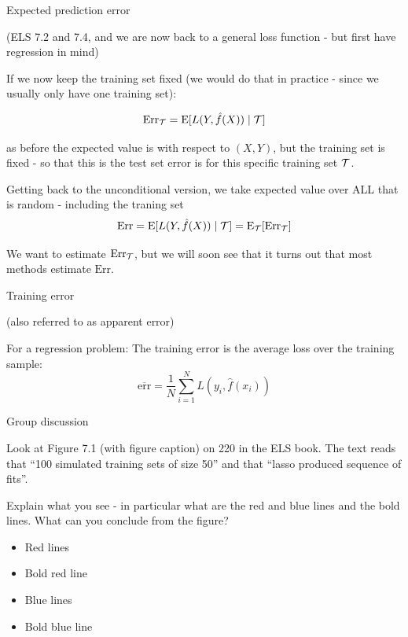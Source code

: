 \documentclass[
  ignorenonframetext,
]{beamer}
\providecommand{\tightlist}{%
  \setlength{\itemsep}{0pt}\setlength{\parskip}{0pt}}
\begin{document}
\begin{frame}

\begin{block}{Expected prediction error}

(ELS 7.2 and 7.4, and we are now back to a general loss function - but
first have regression in mind)

If we now keep the training set fixed (we would do that in practice -
since we usually only have one training set):

\[ \text{Err}_{\cal T}=\text{E}[L(Y,\hat{f}(X))\mid {\cal T}]\]

as before the expected value is with respect to \((X,Y)\), but the
training set is fixed - so that this is the test set error is for this
specific training set \({\cal T}\).

Getting back to the unconditional version, we take expected value over
ALL that is random - including the traning set
\[ \text{Err}=\text{E}[L(Y,\hat{f}(X))\mid {\cal T}]=\text{E}_{\cal T} [\text{Err}_{\cal T}]\]

We want to estimate \(\text{Err}_{\cal T}\), but we will soon see that
it turns out that most methods estimate \(\text{Err}\).

\end{block}

\end{frame}

\begin{frame}

\begin{block}{Training error}

(also referred to as apparent error)

For a regression problem: The training error is the average loss over
the training sample:
\[\overline{\text{err}}=\frac{1}{N} \sum_{i=1}^N L(y_i,\hat{f}(x_i))\]

\end{block}

\begin{block}{Group discussion}

Look at Figure 7.1 (with figure caption) on 220 in the ELS book. The
text reads that ``100 simulated training sets of size 50'' and that
``lasso produced sequence of fits''.

Explain what you see - in particular what are the red and blue lines and
the bold lines. What can you conclude from the figure?

\begin{itemize}
\tightlist
\item
  Red lines
\item
  Bold red line
\item
  Blue lines
\item
  Bold blue line
\end{itemize}

\end{block}

\end{frame}
\end{document}
